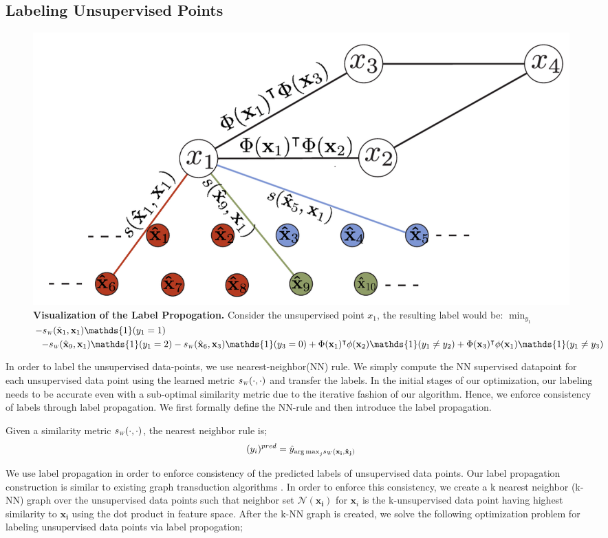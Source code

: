 \subsection{Labeling Unsupervised Points}
\label{label}
\begin{figure}[ht]
\includegraphics[width=\columnwidth]{figure3}
\caption{\textbf{Visualization of the Label Propogation.} Consider the unsupervised point $x_1$, the  resulting label would be: $\min_{y_1}$ \mbox{$-\sw(\hat{\mathbf{x}}_1,\mathbf{x}_1)\mathds{1}(y_1=1)$} $-\sw(\hat{\mathbf{x}}_{9},\mathbf{x}_1)\mathds{1}(y_1=2) -\sw(\hat{\mathbf{x}}_{6},\mathbf{x}_3)\mathds{1}(y_3=0) + \Phi(\mathbf{x}_1)^\intercal\phi(\mathbf{x}_2)\mathds{1}(y_1 \neq y_2) +\Phi(\mathbf{x}_3)^\intercal\phi(\mathbf{x}_1)\mathds{1}(y_1 \neq y_3)$}
\label{vis_label_prop}
\end{figure}
In order to label the unsupervised data-points, we use nearest-neighbor(NN) rule. We simply compute the NN supervised datapoint for each unsupervised data point using the learned metric $\sw(\cdot,\cdot)$ and transfer the labels. In the initial stages of our optimization, our labeling needs to be accurate even with a sub-optimal similarity metric due to the iterative fashion of our algorithm. Hence, we enforce consistency of labels through label propagation. We first formally define the NN-rule and then introduce the label propagation.

Given a similarity metric $\sw(\cdot,\cdot)$, the nearest neighbor rule is;
\begin{equation}
(y_i)^{pred} = \hat{y}_{{\arg\max}_j \sw(\mathbf{x_i}, \mathbf{\hat{x}_j})}
\end{equation}

We use label propagation in order to enforce consistency of the predicted labels of unsupervised data points. Our label propagation construction is similar to existing graph transduction algorithms \cite{label_prop1,label_prop2}. In order to enforce this consistency, we create a k nearest neighbor (k-NN) graph over the unsupervised data points such that neighbor set $\mathcal{N}(\mathbf{x_i})$ for $\mathbf{x}_i$ is the k-unsupervised data point having highest similarity to $\mathbf{x_i}$ using the dot product in feature space. After the k-NN graph is created, we solve the following optimization problem for labeling unsupervised data points via label propogation;

